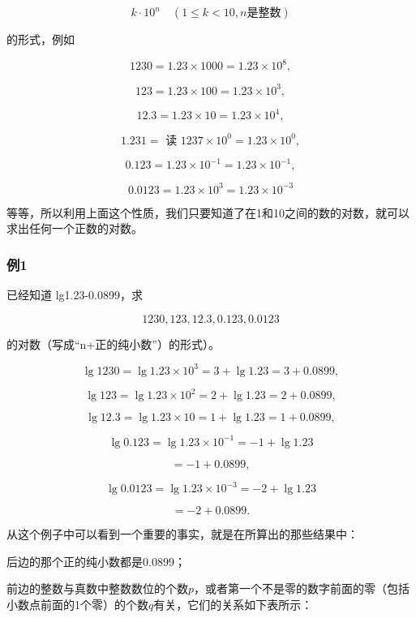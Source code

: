 \[
k \cdot 10^{n} \quad (1 \leqslant k < 10, n \text{是整数})
\]

的形式，例如

\[
1230 = 1.23 \times 1000 = 1.23 \times 10^{8},
\]

\[
123 = 1.23 \times 100 = 1.23 \times 10^{3},
\]

\[
12.3 = 1.23 \times 10 = 1.23 \times 10^{4},
\]

\[
1.231 = \text{ 读 } 1237 \times 10^{0} = 1.23 \times 10^{0},
\]

\[
0.123 = 1.23 \times 10^{- 1} = 1.23 \times 10^{- 1},
\]

\[
0.0123 = 1.23 \times 10^{3} = 1.23 \times 10^{- 3}
\]

等等，所以利用上面这个性质，我们只要知道了在1和10之间的数的对数，就可以求出任何一个正数的对数。

\subsubsection{例1}

已经知道 lg1.23-0.0899，求

\[
1230, 123, 12.3, 0.123, 0.0123
\]

的对数（写成``n+正的纯小数''）的形式）。


\[
\lg 1230 = \lg 1.23 \times 10^{3} = 3 + \lg 1.23 = 3 + 0.0899,
\]

\[
\lg 123 = \lg 1.23 \times 10^{2} = 2 + \lg 1.23 = 2 + 0.0899,
\]

\[
\lg 12.3 = \lg 1.23 \times 10 = 1 + \lg 1.23 = 1 + 0.0899,
\]

\[
\lg 0.123 = \lg 1.23 \times 10^{- 1} = - 1 + \lg 1.23
\]

\[
= - 1 + 0.0899,
\]

\[
\lg 0.0123 = \lg 1.23 \times 10^{- 3} = - 2 + \lg 1.23
\]

\[
= - 2 + 0.0899.
\]

从这个例子中可以看到一个重要的事实，就是在所算出的那些结果中：

后边的那个正的纯小数都是0.0899；

前边的整数与真数中整数数位的个数\(p\)，或者第一个不是零的数字前面的零（包括小数点前面的1个零）的个数\(q\)有关，它们的关系如下表所示：

{\centering
\small\setlength{\tabcolsep}{3pt}%
\par
}

